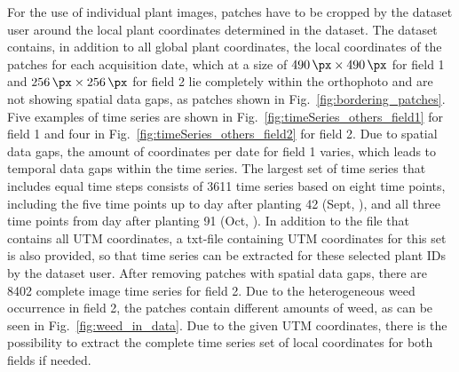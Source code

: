 \documentclass{article}
\def\figref#1{Fig.~\ref{#1}}
\begin{document}
For the use of individual plant images, patches have to be cropped by the dataset user around the local plant coordinates determined in the dataset.
The dataset contains, in addition to all global plant coordinates, the local coordinates of the patches for each acquisition date, which at a size of $\SI{490}{\px} \times \SI{490}{\px}$ for field 1 and $\SI{256}{\px} \times \SI{256}{\px}$ for field 2 lie completely within the orthophoto and are not showing spatial data gaps, as patches shown in \figref{fig:bordering_patches}.
Five examples of time series are shown in \figref{fig:timeSeries_others_field1} for field 1 and four in \figref{fig:timeSeries_others_field2} for field 2. 
%
Due to spatial data gaps, the amount of coordinates per date for field 1 varies, which leads to temporal data gaps within the time series. The largest set of time series that includes equal time steps consists of 3611 time series based on eight time points, including the five time points up to day after planting 42 (Sept, ), and all three time points from day after planting 91 (Oct, ). In addition to the file that contains all UTM coordinates, a txt-file containing UTM coordinates for this set is also provided, so that time series can be extracted for these selected plant IDs by the dataset user.
%
After removing patches with spatial data gaps, there are 8402 complete image time series for field 2. Due to the heterogeneous weed occurrence in field 2, the patches contain different amounts of weed, as can be seen in \figref{fig:weed_in_data}.
%
Due to the given UTM coordinates, there is the possibility to extract the complete time series set of local coordinates for both fields if needed.
\end{document}
